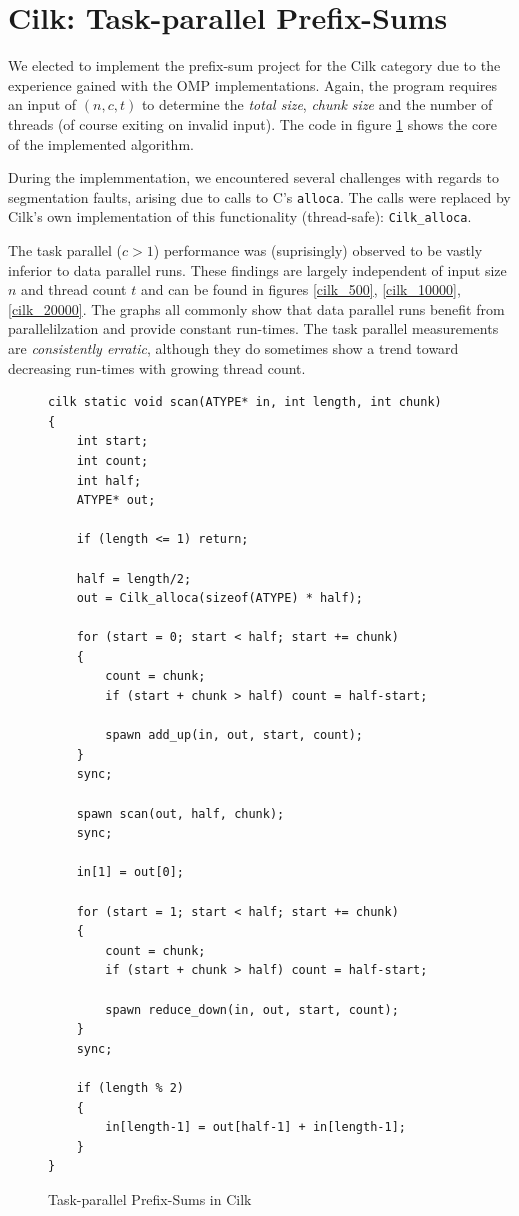 \documentclass[12pt]{article}
\begin{document}
\section{Cilk: Task-parallel Prefix-Sums}
We elected to implement the prefix-sum project for the Cilk category due to the experience gained with the OMP implementations. Again, the program requires an input of $(n, c, t)$ to determine the \emph{total size}, \emph{chunk size} and the number of threads (of course exiting on invalid input). The code in figure \ref{cilk_prefix_code} shows the core of the implemented algorithm.

During the implemmentation, we encountered several challenges with regards to segmentation faults, arising due to calls to C's \verb=alloca=. The calls were replaced by Cilk's own implementation of this functionality (thread-safe): \verb=Cilk_alloca=.

The task parallel ($c > 1$) performance was (suprisingly) observed to be vastly inferior to data parallel runs. These findings are largely independent of input size $n$ and thread count $t$ and can be found in figures \ref{cilk_500}, \ref{cilk_10000}, \ref{cilk_20000}. The graphs all commonly show that data parallel runs benefit from parallelilzation and provide constant run-times. The task parallel measurements are \emph{consistently erratic}, although they do sometimes show a trend toward decreasing run-times with growing thread count.





\begin{figure}[H]
\caption{Task-parallel Prefix-Sums in Cilk}
\begin{lstlisting}
cilk static void scan(ATYPE* in, int length, int chunk)
{
	int start;
	int count;
	int half;
	ATYPE* out;

	if (length <= 1) return;

	half = length/2;
	out = Cilk_alloca(sizeof(ATYPE) * half);

	for (start = 0; start < half; start += chunk) 
	{
		count = chunk;
		if (start + chunk > half) count = half-start;

		spawn add_up(in, out, start, count);
	}
	sync;

	spawn scan(out, half, chunk);
	sync;

	in[1] = out[0];

	for (start = 1; start < half; start += chunk) 
	{
		count = chunk;
		if (start + chunk > half) count = half-start;

		spawn reduce_down(in, out, start, count);
	}
	sync;

	if (length % 2)
	{
		in[length-1] = out[half-1] + in[length-1];
	}
}
\end{lstlisting}
\label{cilk_prefix_code}
\end{figure}
\end{document}
